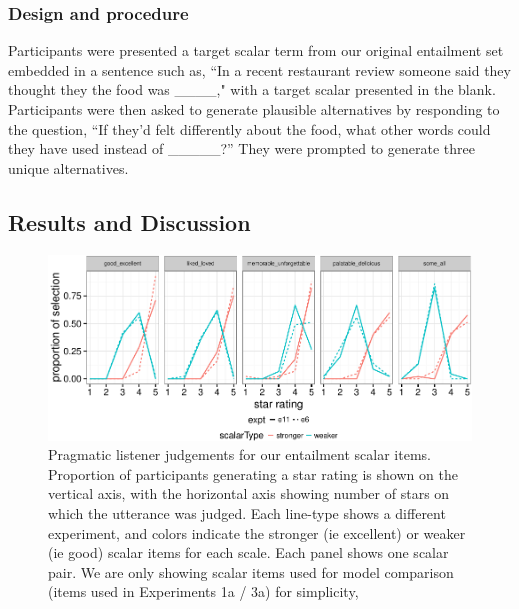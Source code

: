 \documentclass[10pt, letterpaper]{article}
\newenvironment{CodeChunk}{}{}
\begin{document}
\subsubsection{Design and procedure}\label{design-and-procedure-1}

Participants were presented a target scalar term from our original
entailment set embedded in a sentence such as, ``In a recent restaurant
review someone said they thought they the food was \_\_\_\_," with a
target scalar presented in the blank. Participants were then asked to
generate plausible alternatives by responding to the question, ``If
they'd felt differently about the food, what other words could they have
used instead of \_\_\_\_\_?'' They were prompted to generate three
unique alternatives.

\subsection{Results and Discussion}\label{results-and-discussion-1}

\begin{CodeChunk}
\begin{figure}[t]

{\centering \includegraphics{figs/exp2Plots-1} 

}

\caption[Pragmatic listener judgements for our entailment scalar items]{Pragmatic listener judgements for our entailment scalar items. Proportion of participants generating a star rating is shown on the vertical axis, with the horizontal axis showing number of stars on which the utterance was judged. Each line-type shows a different experiment, and colors indicate the stronger (ie excellent) or weaker (ie good) scalar items for each scale. Each panel shows one scalar pair. We are only showing scalar items used for model comparison (items used in Experiments 1a / 3a) for simplicity,}\label{fig:exp2Plots}
\end{figure}
\end{CodeChunk}
\end{document}
